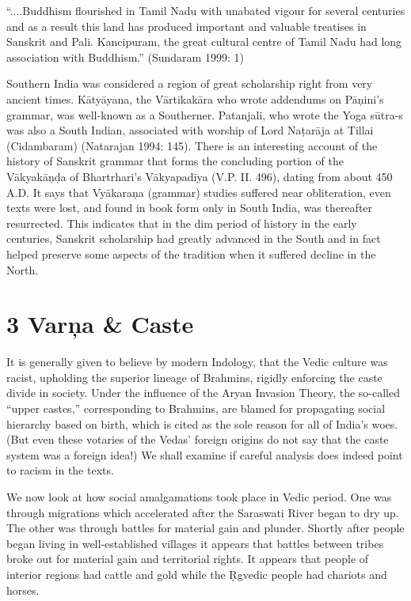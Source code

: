 \begin{myquote}
“....Buddhism flourished in Tamil Nadu with unabated vigour for several centuries and as a result this land has produced important and valuable treatises in Sanskrit and Pali. Kancipuram, the great cultural centre of Tamil Nadu had long association with Buddhism.” (Sundaram 1999: 1)
\end{myquote}

Southern India was considered a region of great scholarship right from very ancient times. Kātyāyana, the Vārtikakāra who wrote addendums on Pāņini’s grammar, was well-known as a Southerner. Patanjali, who wrote the Yoga sūtra-s was also a South Indian, associated with worship of Lord Naṭarāja at Tillai (Cidambaram) (Natarajan 1994: 145). There is an interesting account of the history of Sanskrit grammar that forms the concluding portion of the Vākyakāņḍa of Bhartrhari’s Vākyapadīya (V.P. II. 496), dating from about 450 A.D. It says that Vyākaraņa (grammar) studies suffered near obliteration, even texts were lost, and found in book form only in South India, was thereafter resurrected. This indicates that in the dim period of history in the early centuries, Sanskrit scholarship had greatly advanced in the South and in fact helped preserve some aspects of the tradition when it suffered decline in the North.


\section*{3 Varņa \& Caste}

It is generally given to believe by modern Indology, that the Vedic culture was racist, upholding the superior lineage of Brahmins, rigidly enforcing the caste divide in society. Under the influence of the Aryan Invasion Theory, the so-called “upper castes,” corresponding to Brahmins, are blamed for propagating social hierarchy based on birth, which is cited as the sole reason for all of India’s woes. (But even these votaries of the Vedas’ foreign origins do not say that the caste system was a foreign idea!) We shall examine if careful analysis does indeed point to racism in the texts.

We now look at how social amalgamations took place in Vedic period. One was through migrations which accelerated after the Saraswati River began to dry up. The other was through battles for material gain and plunder. Shortly after people began living in well-established villages it appears that battles between tribes broke out for material gain and territorial rights. It appears that people of interior regions had cattle and gold while the Ṛgvedic people had chariots and horses. 

